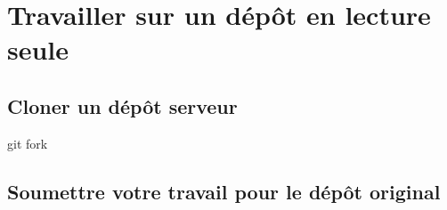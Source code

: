 \section{Travailler sur un dépôt en lecture seule}
\subsection{Cloner un dépôt serveur}

git fork

\subsection{Soumettre votre travail pour le dépôt original}

